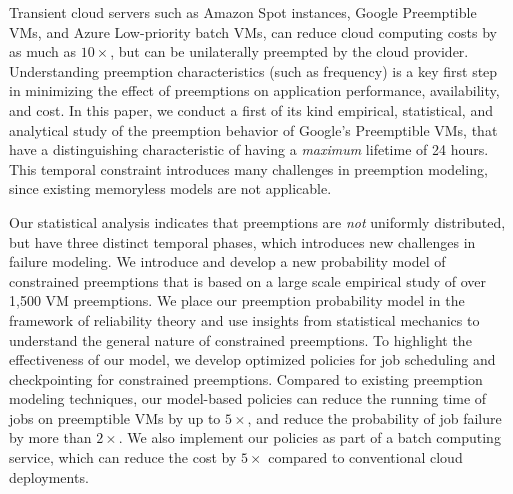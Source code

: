 Transient cloud servers such as Amazon Spot instances, Google Preemptible VMs, and Azure Low-priority batch VMs, can reduce cloud computing costs by as much as $10\times$, but can be unilaterally preempted by the cloud provider.
Understanding preemption characteristics (such as frequency) is a key first step in minimizing the effect of preemptions on application performance, availability, and cost. 
In this paper, we conduct a first of its kind empirical, statistical, and analytical study of the preemption behavior of Google's Preemptible VMs, 
that have a distinguishing characteristic of having a \emph{maximum} lifetime of 24 hours. 
This temporal constraint introduces many challenges in preemption modeling, since existing memoryless models are not applicable. 

Our statistical analysis indicates that preemptions %
are \emph{not} uniformly distributed, but have three distinct temporal phases, which introduces new challenges in failure modeling.  
We introduce and develop a new probability model of constrained preemptions that is based on a large scale empirical study of over 1,500 VM preemptions. 
We place our preemption probability model in the framework of reliability theory and use insights from statistical mechanics to understand the general nature of constrained preemptions. 
To highlight the effectiveness of our model, we develop optimized policies for job scheduling and checkpointing for constrained preemptions. 
Compared to existing preemption modeling techniques, our model-based policies can reduce the running time of jobs on preemptible VMs by up to $5\times$, and reduce the probability of job failure by more than $2\times$. 
We also implement our policies as part of a batch computing service, which can reduce the cost by $5\times$ compared to conventional cloud deployments.







